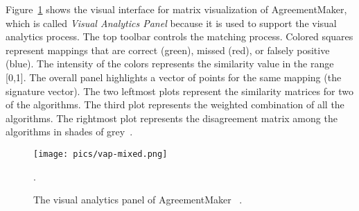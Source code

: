 Figure~\ref{fig:vapanel} shows the visual interface for matrix visualization of AgreementMaker, which is called {\it Visual Analytics Panel\/} because it is used to support the visual analytics process. The top toolbar controls the matching process. Colored squares represent mappings that are correct (green), missed (red), or falsely positive (blue). The intensity of the colors represents the similarity value in the range [0,1]. The overall panel highlights a vector of points for the same mapping (the signature vector). The two leftmost plots represent the similarity matrices for two of the algorithms. The third plot represents the weighted combination of all the algorithms. The rightmost plot represents the disagreement matrix among the algorithms in shades of grey~\cite{cruz-icde-demo}.

\begin{figure}[h]
	\centering
	\texttt{[image: pics/vap-mixed.png]}
	\caption{The visual analytics panel of AgreementMaker ~\cite{cruz-icde-demo}.}.
	\label{fig:vapanel}
\end{figure}
	



